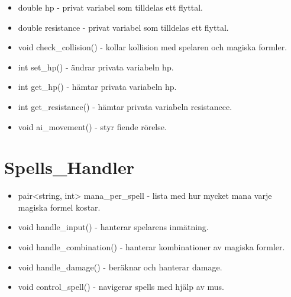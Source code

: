 \documentclass{TDP005mall}
\begin{document}
\begin{itemize}

    \item double hp - privat variabel som tilldelas ett flyttal. 
    \item double resistance - privat variabel som tilldelas ett flyttal.
    \item void check_collision() - kollar kollision med spelaren och magiska formler. 
    \item int set_hp() - ändrar privata variabeln hp.
    \item int get_hp() - hämtar privata variabeln hp.
    \item int get_resistance() - hämtar privata variabeln resistancce.
    \item void ai_movement() - styr fiende rörelse. 
    
\end{itemize}

\section{Spells_Handler}

\begin{itemize}

    \item pair<string, int> mana_per_spell - lista med hur mycket mana varje magiska formel kostar. 
    \item void handle_input() - hanterar spelarens inmätning. 
    \item void handle_combination() - hanterar kombinationer av magiska     formler. 
    \item void handle_damage() - beräknar och hanterar damage. 
    \item void control_spell() - navigerar spells med hjälp av mus. 
    
\end{itemize}
\end{document}
